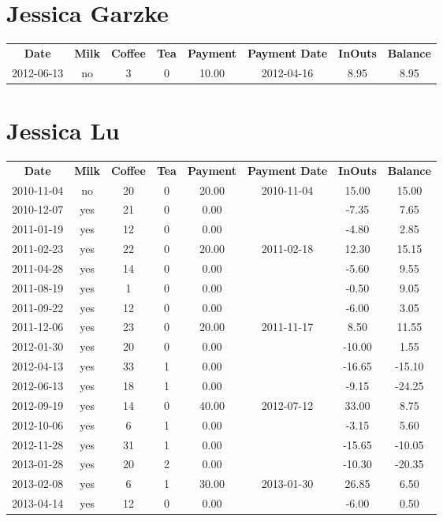 \section{Jessica Garzke}

\begin{center}
\begin{tabular}{cccccccc}
\textbf{Date} & \textbf{Milk} & \textbf{Coffee} & \textbf{Tea} & \textbf{Payment} & \textbf{Payment Date} & \textbf{InOuts} & \textbf{Balance} \\
2012-06-13 & no & 3 & 0 & 10.00 & 2012-04-16 & 8.95 & 8.95
\end{tabular}
\end{center}

\section{Jessica Lu}

\begin{center}
\begin{tabular}{cccccccc}
\textbf{Date} & \textbf{Milk} & \textbf{Coffee} & \textbf{Tea} & \textbf{Payment} & \textbf{Payment Date} & \textbf{InOuts} & \textbf{Balance} \\
2010-11-04 & no & 20 & 0 & 20.00 & 2010-11-04 &  15.00 &  15.00\\ 
2010-12-07 & yes & 21 & 0 &  0.00 &  &  -7.35 &   7.65\\ 
2011-01-19 & yes & 12 & 0 &  0.00 &  &  -4.80 &   2.85\\ 
2011-02-23 & yes & 22 & 0 & 20.00 & 2011-02-18 &  12.30 &  15.15\\ 
2011-04-28 & yes & 14 & 0 &  0.00 &  &  -5.60 &   9.55\\ 
2011-08-19 & yes &  1 & 0 &  0.00 &  &  -0.50 &   9.05\\ 
2011-09-22 & yes & 12 & 0 &  0.00 &  &  -6.00 &   3.05\\ 
2011-12-06 & yes & 23 & 0 & 20.00 & 2011-11-17 &   8.50 &  11.55\\ 
2012-01-30 & yes & 20 & 0 &  0.00 &  & -10.00 &   1.55\\ 
2012-04-13 & yes & 33 & 1 &  0.00 &  & -16.65 & -15.10\\ 
2012-06-13 & yes & 18 & 1 &  0.00 &  &  -9.15 & -24.25\\ 
2012-09-19 & yes & 14 & 0 & 40.00 & 2012-07-12 &  33.00 &   8.75\\ 
2012-10-06 & yes &  6 & 1 &  0.00 &  &  -3.15 &   5.60\\ 
2012-11-28 & yes & 31 & 1 &  0.00 &  & -15.65 & -10.05\\ 
2013-01-28 & yes & 20 & 2 &  0.00 &  & -10.30 & -20.35\\ 
2013-02-08 & yes &  6 & 1 & 30.00 & 2013-01-30 &  26.85 &   6.50\\ 
2013-04-14 & yes & 12 & 0 &  0.00 &  &  -6.00 &   0.50
\end{tabular}
\end{center}

